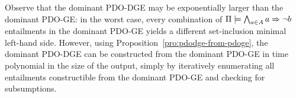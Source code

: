 Observe that the dominant PDO-DGE may be exponentially larger than the
dominant PDO-GE: in the worst case, every combination of
$\Pi \models \bigwedge_{a \in A} a \Rightarrow \neg b$ entailments in the
dominant PDO-GE yields a different set-inclusion minimal left-hand
side. However, using Proposition~\ref{pro:pdodge-from-pdoge}, the
dominant PDO-DGE can be constructed from the dominant PDO-GE in time
polynomial in the size of the output, simply by iteratively
enumerating all entailments constructible from the dominant PDO-GE and
checking for subsumptions.











































































